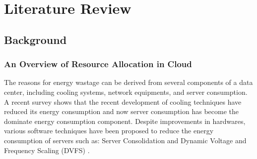 \chapter{Literature Review}\label{C:background}
\section*{Background}

\subsection*{An Overview of Resource Allocation in Cloud}


The reasons for energy wastage can be derived from several components of a data center, including 
cooling systems, network equipments, and server consumption. 
A recent survey \cite{Cho:2016kz} shows that the recent development of cooling techniques 
have reduced its energy consumption and now 
server consumption has become the dominate energy consumption component.
Despite improvements in hardwares, various software techniques have been proposed 
to reduce the energy consumption of servers 
such as: Server Consolidation and Dynamic Voltage and Frequency Scaling (DVFS) \cite{}.

 

